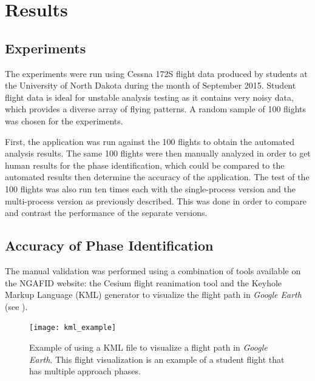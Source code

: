 
\section{Results} \label{sec:results}

\subsection{Experiments}

	The experiments were run using Cessna 172S flight data produced by students at the University of North Dakota during the month of September 2015.  Student flight data is ideal for unstable analysis testing as it contains very noisy data, which provides a diverse array of flying patterns.  A random sample of 100 flights was chosen for the experiments.
        
    First, the application was run against the 100 flights to obtain the automated analysis results.  The same 100 flights were then manually analyzed in order to get human results for the phase identification, which could be compared to the automated results then determine the accuracy of the application.  The test of the 100 flights was also run ten times each with the single-process version and the multi-process version as previously described.  This was done in order to compare and contrast the performance of the separate versions.


\subsection{Accuracy of Phase Identification}

	The manual validation was performed using a combination of tools available on the NGAFID website:  the Cesium flight reanimation tool and the Keyhole Markup Language (KML) generator to visualize the flight path in \textit{Google Earth}~\cite{nolan2014keyhole} (see ).
    
    \begin{figure}
    	\centering
        \texttt{[image: kml\_example]}
        \caption{Example of using a KML file to visualize a flight path in \textit{Google Earth}.  This flight visualization is an example of a student flight that has multiple approach phases.}
        \label{fig:kml_example}
    \end{figure}
    
